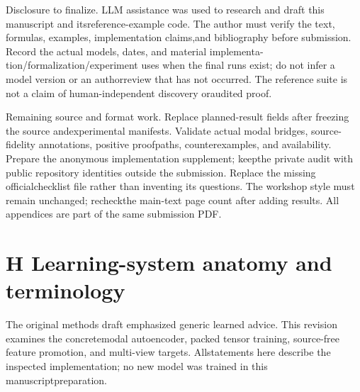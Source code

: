 \noindent
Disclosure to finalize. LLM assistance was used to research and draft this manuscript and its\linebreak[4]
reference-example code. The author must verify the text, formulas, examples, implementation claims,\linebreak[4]
and bibliography before submission. Record the actual models, dates, and material implementa-\linebreak[4]
tion/formalization/experiment uses when the final runs exist; do not infer a model version or an author\linebreak[4]
review that has not occurred. The reference suite is not a claim of human-independent discovery or\linebreak[4]
audited proof.\par

\noindent
Remaining source and format work. Replace planned-result fields after freezing the source and\linebreak[4]
experimental manifests. Validate actual modal bridges, source-fidelity annotations, positive proof\linebreak[4]
paths, counterexamples, and availability. Prepare the anonymous implementation supplement; keep\linebreak[4]
the private audit with public repository identities outside the submission. Replace the missing official\linebreak[4]
checklist file rather than inventing its questions. The workshop style must remain unchanged; recheck\linebreak[4]
the main-text page count after adding results. All appendices are part of the same submission PDF.\par

\section*{H  Learning-system anatomy and terminology}
\noindent
The original methods draft emphasized generic learned advice. This revision examines the concrete\linebreak[4]
modal autoencoder, packed tensor training, source-free feature promotion, and multi-view targets. All\linebreak[4]
statements here describe the inspected implementation; no new model was trained in this manuscript\linebreak[4]
preparation.\par

